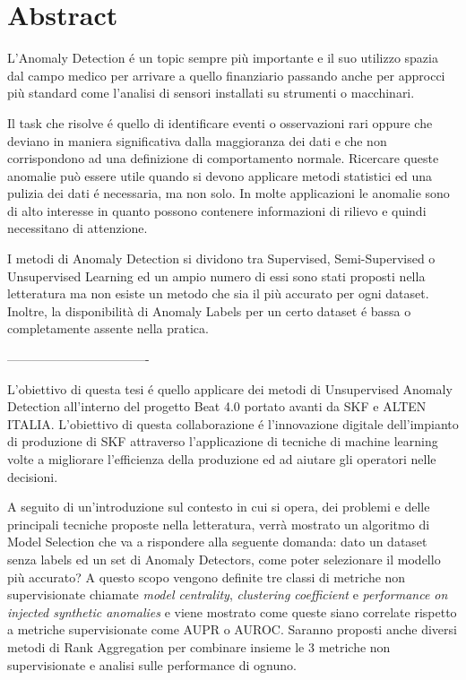 \chapter*{Abstract}
L’Anomaly Detection é un topic sempre più importante e il suo utilizzo spazia dal campo medico per arrivare a quello finanziario passando anche per approcci più standard come l'analisi di sensori installati su strumenti o macchinari.

Il task che risolve é quello di identificare eventi o osservazioni rari oppure che deviano in maniera significativa dalla maggioranza dei dati e che non corrispondono ad una definizione di comportamento normale. Ricercare queste anomalie può essere utile quando si devono applicare metodi statistici ed una pulizia dei dati é necessaria, ma non solo. In molte applicazioni le anomalie sono di alto interesse in quanto possono contenere informazioni di rilievo e quindi necessitano di attenzione. 

I metodi di Anomaly Detection si dividono tra Supervised, Semi-Supervised o Unsupervised Learning ed un ampio numero di essi sono stati proposti nella letteratura ma non esiste un metodo che sia il più accurato per ogni dataset. Inoltre, la disponibilità di Anomaly Labels per un certo dataset é bassa o completamente assente nella pratica. 

----------------------------------

L’obiettivo di questa tesi é quello applicare dei metodi di Unsupervised Anomaly Detection all'interno del progetto Beat 4.0 portato avanti da SKF e ALTEN ITALIA. L'obiettivo di questa collaborazione é l'innovazione digitale dell'impianto di produzione di SKF attraverso l'applicazione di tecniche di machine learning volte a migliorare l'efficienza della produzione ed ad aiutare gli operatori nelle decisioni.

A seguito di un'introduzione sul contesto in cui si opera, dei problemi e delle principali tecniche proposte nella letteratura, verrà mostrato un algoritmo di Model Selection che va a rispondere alla seguente domanda: dato un dataset senza labels ed un set di Anomaly Detectors, come poter selezionare il modello più accurato? A questo scopo vengono definite tre classi di metriche non supervisionate chiamate \textit{model centrality}, \textit{clustering coefficient} e \textit{performance on injected synthetic anomalies} e viene mostrato come queste siano correlate rispetto a metriche supervisionate come AUPR o AUROC. Saranno proposti anche diversi metodi di Rank Aggregation per combinare insieme le 3 metriche non supervisionate e analisi sulle performance di ognuno.

